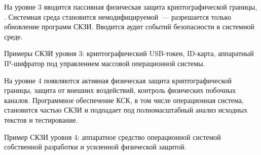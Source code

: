 На уровне 3 вводится пассивная физическая защита криптографической границы,
. Системная среда становится немодифицируемой~--- разрешается только 
обновление программ СКЗИ. Вводится аудит событий безопасности в системной среде.

Примеры СКЗИ уровня 3: криптографический USB-токен, ID-карта, 
аппаратный IP-шифратор под управлением массовой операционной системы.

На уровне 4 появляются активная физическая защита криптографической границы,
защита от внешних воздействий, 
контроль физических побочных каналов.
%
%
Программное обеспечение КСК, в том числе операционная система, становится 
частью СКЗИ и подпадает под полномасштабный анализ исходных текстов и 
тестирование. 
%

Пример СКЗИ уровня 4: аппаратное средство 
 операционной системой собственной разработки
и усиленной физической защитой. 

